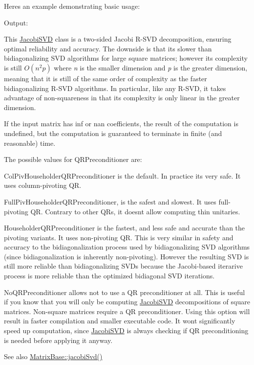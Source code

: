 Here\textquotesingle{}s an example demonstrating basic usage\+: 
\begin{DoxyCodeInclude}
\end{DoxyCodeInclude}
 Output\+: 
\begin{DoxyVerbInclude}
\end{DoxyVerbInclude}


This \hyperlink{group___s_v_d___module_class_eigen_1_1_jacobi_s_v_d}{Jacobi\+S\+VD} class is a two-\/sided Jacobi R-\/\+S\+VD decomposition, ensuring optimal reliability and accuracy. The downside is that it\textquotesingle{}s slower than bidiagonalizing S\+VD algorithms for large square matrices; however its complexity is still $ O(n^2p) $ where {\itshape n} is the smaller dimension and {\itshape p} is the greater dimension, meaning that it is still of the same order of complexity as the faster bidiagonalizing R-\/\+S\+VD algorithms. In particular, like any R-\/\+S\+VD, it takes advantage of non-\/squareness in that its complexity is only linear in the greater dimension.

If the input matrix has inf or nan coefficients, the result of the computation is undefined, but the computation is guaranteed to terminate in finite (and reasonable) time.

The possible values for Q\+R\+Preconditioner are\+: \begin{DoxyItemize}
\item Col\+Piv\+Householder\+Q\+R\+Preconditioner is the default. In practice it\textquotesingle{}s very safe. It uses column-\/pivoting QR. \item Full\+Piv\+Householder\+Q\+R\+Preconditioner, is the safest and slowest. It uses full-\/pivoting QR. Contrary to other Q\+Rs, it doesn\textquotesingle{}t allow computing thin unitaries. \item Householder\+Q\+R\+Preconditioner is the fastest, and less safe and accurate than the pivoting variants. It uses non-\/pivoting QR. This is very similar in safety and accuracy to the bidiagonalization process used by bidiagonalizing S\+VD algorithms (since bidiagonalization is inherently non-\/pivoting). However the resulting S\+VD is still more reliable than bidiagonalizing S\+V\+Ds because the Jacobi-\/based iterarive process is more reliable than the optimized bidiagonal S\+VD iterations. \item No\+Q\+R\+Preconditioner allows not to use a QR preconditioner at all. This is useful if you know that you will only be computing \hyperlink{group___s_v_d___module_class_eigen_1_1_jacobi_s_v_d}{Jacobi\+S\+VD} decompositions of square matrices. Non-\/square matrices require a QR preconditioner. Using this option will result in faster compilation and smaller executable code. It won\textquotesingle{}t significantly speed up computation, since \hyperlink{group___s_v_d___module_class_eigen_1_1_jacobi_s_v_d}{Jacobi\+S\+VD} is always checking if QR preconditioning is needed before applying it anyway.\end{DoxyItemize}
\begin{DoxySeeAlso}{See also}
\hyperlink{group___core___module_a5745dca9c54390633b434e54a1d1eedd}{Matrix\+Base\+::jacobi\+Svd()} 
\end{DoxySeeAlso}


